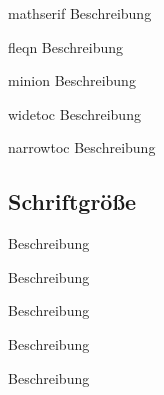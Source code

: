 \documentclass[a4paper,colorscheme=green,TUBStitlepage=picture]{tubsreprt}
\begin{document}
\begin{classoption}{mathserif}
  Beschreibung
\end{classoption}

\begin{classoption}{fleqn}
  Beschreibung
\end{classoption}

\begin{classoption}{minion}
  Beschreibung
\end{classoption}

\begin{classoption}{widetoc}
  Beschreibung
\end{classoption}

\begin{classoption}{narrowtoc}
  Beschreibung
\end{classoption}

\subsection{Schriftgröße}

\begin{classoption}{9pt}
  Beschreibung
\end{classoption}

\begin{classoption}{10pt}
  Beschreibung
\end{classoption}

\begin{classoption}{11pt}
  Beschreibung
\end{classoption}

\begin{classoption}{12pt}
  Beschreibung
\end{classoption}

\begin{classoption}{14pt}
  Beschreibung
\end{classoption}
\end{document}
